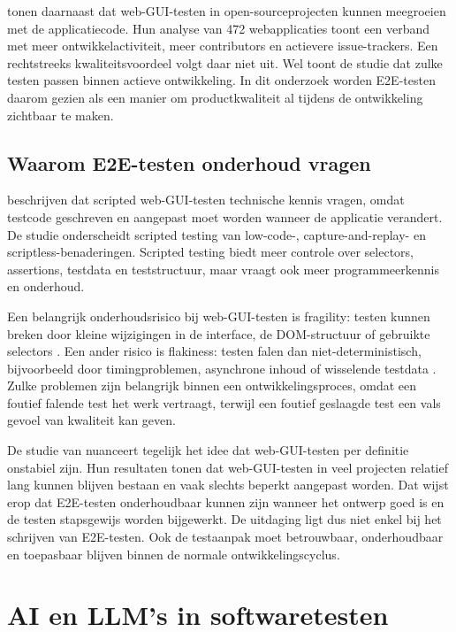 \textcite{DiMeglio2026} tonen daarnaast dat web-GUI-testen in open-sourceprojecten kunnen meegroeien met de applicatiecode. Hun analyse van 472 webapplicaties toont een verband met meer ontwikkelactiviteit, meer contributors en actievere issue-trackers. Een rechtstreeks kwaliteitsvoordeel volgt daar niet uit. Wel toont de studie dat zulke testen passen binnen actieve ontwikkeling. In dit onderzoek worden E2E-testen daarom gezien als een manier om productkwaliteit al tijdens de ontwikkeling zichtbaar te maken.

\subsection{Waarom E2E-testen onderhoud vragen}

\textcite{DiMeglio2026} beschrijven dat scripted web-GUI-testen technische kennis vragen, omdat testcode geschreven en aangepast moet worden wanneer de applicatie verandert. De studie onderscheidt scripted testing van low-code-, capture-and-replay- en scriptless-benaderingen. Scripted testing biedt meer controle over selectors, assertions, testdata en teststructuur, maar vraagt ook meer programmeerkennis en onderhoud.

Een belangrijk onderhoudsrisico bij web-GUI-testen is fragility: testen kunnen breken door kleine wijzigingen in de interface, de DOM-structuur of gebruikte selectors \autocite{DiMeglio2026}. Een ander risico is flakiness: testen falen dan niet-deterministisch, bijvoorbeeld door timingproblemen, asynchrone inhoud of wisselende testdata \autocite{DiMeglio2026}. Zulke problemen zijn belangrijk binnen een ontwikkelingsproces, omdat een foutief falende test het werk vertraagt, terwijl een foutief geslaagde test een vals gevoel van kwaliteit kan geven.

De studie van \textcite{DiMeglio2026} nuanceert tegelijk het idee dat web-GUI-testen per definitie onstabiel zijn. Hun resultaten tonen dat web-GUI-testen in veel projecten relatief lang kunnen blijven bestaan en vaak slechts beperkt aangepast worden. Dat wijst erop dat E2E-testen onderhoudbaar kunnen zijn wanneer het ontwerp goed is en de testen stapsgewijs worden bijgewerkt. De uitdaging ligt dus niet enkel bij het schrijven van E2E-testen. Ook de testaanpak moet betrouwbaar, onderhoudbaar en toepasbaar blijven binnen de normale ontwikkelingscyclus.

\section{AI en LLM's in softwaretesten}

